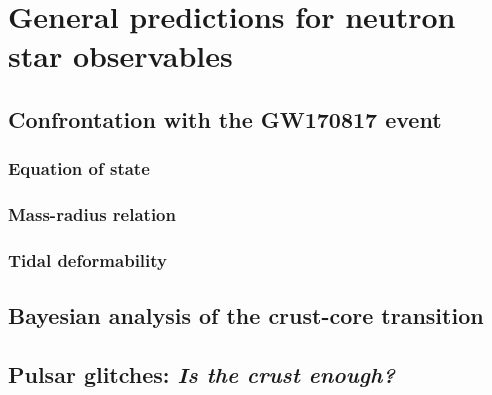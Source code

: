 \section{General predictions for neutron star observables}\label{sec:general}


\subsection{Confrontation with the GW170817 event} %


\subsubsection{Equation of state} %

\subsubsection{Mass-radius relation} %


\subsubsection{Tidal deformability} %


\subsection{Bayesian analysis of the crust-core transition} %


\subsection{Pulsar glitches: 
\textit{Is the crust enough?}}\label{subsec:gli_stats} %

